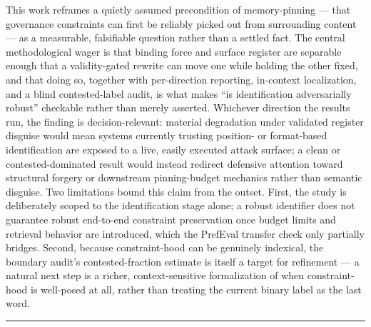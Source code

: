 \documentclass[11pt]{article}
\begin{document}
This work reframes a quietly assumed precondition of memory-pinning --- that governance constraints can first be reliably picked out from surrounding content --- as a measurable, falsifiable question rather than a settled fact. The central methodological wager is that binding force and surface register are separable enough that a validity-gated rewrite can move one while holding the other fixed, and that doing so, together with per-direction reporting, in-context localization, and a blind contested-label audit, is what makes ``is identification adversarially robust'' checkable rather than merely asserted. Whichever direction the results run, the finding is decision-relevant: material degradation under validated register disguise would mean systems currently trusting position- or format-based identification are exposed to a live, easily executed attack surface; a clean or contested-dominated result would instead redirect defensive attention toward structural forgery or downstream pinning-budget mechanics rather than semantic disguise. Two limitations bound this claim from the outset. First, the study is deliberately scoped to the identification stage alone; a robust identifier does not guarantee robust end-to-end constraint preservation once budget limits and retrieval behavior are introduced, which the PrefEval transfer check only partially bridges. Second, because constraint-hood can be genuinely indexical, the boundary audit's contested-fraction estimate is itself a target for refinement --- a natural next step is a richer, context-sensitive formalization of when constraint-hood is well-posed at all, rather than treating the current binary label as the last word.

\vspace{1em}
\hrule
\vspace{1em}
\end{document}
